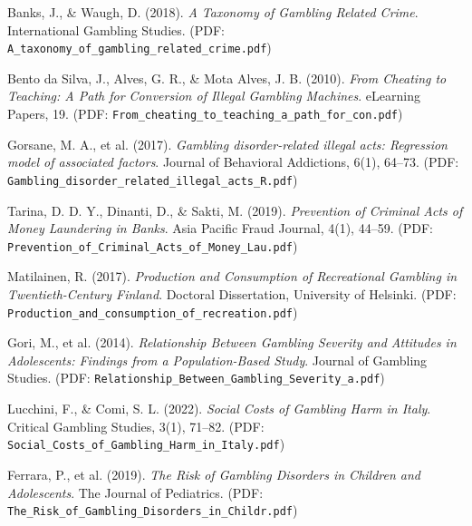 \documentclass[a4paper,12pt]{article}
\begin{document}
\newpage
\begin{thebibliography}{99}

Banks, J., \& Waugh, D. (2018). \textit{A Taxonomy of Gambling Related Crime}. International Gambling Studies. 
(PDF: \texttt{A\_taxonomy\_of\_gambling\_related\_crime.pdf})

Bento da Silva, J., Alves, G. R., \& Mota Alves, J. B. (2010). \textit{From Cheating to Teaching: A Path for Conversion of Illegal Gambling Machines}. eLearning Papers, 19.
(PDF: \texttt{From\_cheating\_to\_teaching\_a\_path\_for\_con.pdf})

Gorsane, M. A., et al. (2017). \textit{Gambling disorder-related illegal acts: Regression model of associated factors}. Journal of Behavioral Addictions, 6(1), 64–73.
(PDF: \texttt{Gambling\_disorder\_related\_illegal\_acts\_R.pdf})

Tarina, D. D. Y., Dinanti, D., \& Sakti, M. (2019). \textit{Prevention of Criminal Acts of Money Laundering in Banks}. Asia Pacific Fraud Journal, 4(1), 44–59.
(PDF: \texttt{Prevention\_of\_Criminal\_Acts\_of\_Money\_Lau.pdf})

Matilainen, R. (2017). \textit{Production and Consumption of Recreational Gambling in Twentieth-Century Finland}. Doctoral Dissertation, University of Helsinki.
(PDF: \texttt{Production\_and\_consumption\_of\_recreation.pdf})

Gori, M., et al. (2014). \textit{Relationship Between Gambling Severity and Attitudes in Adolescents: Findings from a Population-Based Study}. Journal of Gambling Studies.
(PDF: \texttt{Relationship\_Between\_Gambling\_Severity\_a.pdf})

Lucchini, F., \& Comi, S. L. (2022). \textit{Social Costs of Gambling Harm in Italy}. Critical Gambling Studies, 3(1), 71–82. 
(PDF: \texttt{Social\_Costs\_of\_Gambling\_Harm\_in\_Italy.pdf})

Ferrara, P., et al. (2019). \textit{The Risk of Gambling Disorders in Children and Adolescents}. The Journal of Pediatrics.
(PDF: \texttt{The\_Risk\_of\_Gambling\_Disorders\_in\_Childr.pdf})

\end{thebibliography}
\end{document}
